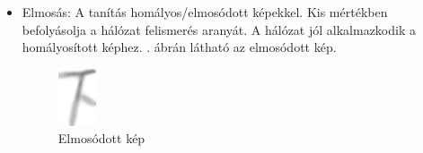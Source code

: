\begin{itemize}
\item Elmosás: A tanítás homályos/elmosódott képekkel. Kis mértékben befolyásolja a hálózat felismerés aranyát. A hálózat jól alkalmazkodik a homályosított képhez. . ábrán látható az elmosódott kép.

\begin{figure}[h!]
	\centering
	\includegraphics[scale=1.0]{images/blur}
	\caption{Elmosódott kép}
	\label{fig:blur}
\end{figure}

\end{itemize}